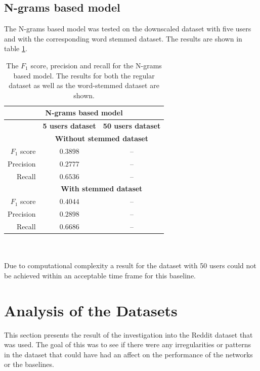 \subsection{N-grams based model}
The N-grams based model was tested on the downscaled dataset with five users and with the corresponding word stemmed dataset. The results are shown in table \ref{table:ngram_results}.
\begin{table}[h!]
    \centering
    \begin{tabular}{ r | c | c }
     \multicolumn{3}{c}{\textbf{N-grams based model}} \\ \hline
     & \textbf{5 users dataset} & \textbf{50 users dataset} \\ \hline \hline
     & \multicolumn{2}{c}{\textbf{Without stemmed dataset}} \\ \hline \hline
    $F_1$ score & $0.3898$ & -- \\ \hline
    Precision & $0.2777$ & -- \\ \hline
    Recall & $0.6536$ & -- \\ \hline \hline
    & \multicolumn{2}{c}{\textbf{With stemmed dataset}} \\ \hline \hline
    $F_1$ score & $0.4044$ & -- \\ \hline
    Precision & $0.2898$ & -- \\ \hline
    Recall & $0.6686$ & -- \\ \hline
    \end{tabular}
    \caption{The $F_1$ score, precision and recall for the N-grams based model. The results for both the regular dataset as well as the word-stemmed dataset are shown.}
    \label{table:ngram_results}
\end{table}
\\\\
Due to computational complexity a result for the dataset with 50 users could not be achieved within an acceptable time frame for this baseline.

\section{Analysis of the Datasets}
\label{sec:dataset-summary}
This section presents the result of the investigation into the Reddit dataset that was used. The goal of this was to see if there were any irregularities or patterns in the dataset that could have had an affect on the performance of the networks or the baselines.

